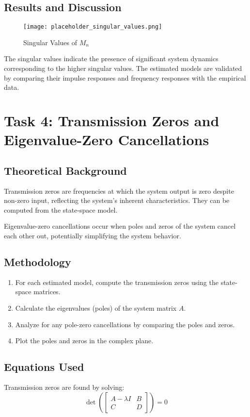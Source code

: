 \documentclass[12pt]{article}
\begin{document}
\subsection{Results and Discussion}
\begin{figure}[H]
    \centering
    \texttt{[image: placeholder\_singular\_values.png]}
    \caption{Singular Values of $M_n$}
    \label{fig:singular_values}
\end{figure}

The singular values indicate the presence of significant system dynamics corresponding to the higher singular values. The estimated models are validated by comparing their impulse responses and frequency responses with the empirical data.

\section{Task 4: Transmission Zeros and Eigenvalue-Zero Cancellations}
\subsection{Theoretical Background}
Transmission zeros are frequencies at which the system output is zero despite non-zero input, reflecting the system's inherent characteristics. They can be computed from the state-space model.

Eigenvalue-zero cancellations occur when poles and zeros of the system cancel each other out, potentially simplifying the system behavior.

\subsection{Methodology}
\begin{enumerate}
    \item For each estimated model, compute the transmission zeros using the state-space matrices.
    \item Calculate the eigenvalues (poles) of the system matrix $A$.
    \item Analyze for any pole-zero cancellations by comparing the poles and zeros.
    \item Plot the poles and zeros in the complex plane.
\end{enumerate}

\subsection{Equations Used}
Transmission zeros are found by solving:
\begin{equation}
    \det\left( \begin{bmatrix}
    A - \lambda I & B \\
    C & D
    \end{bmatrix} \right) = 0
\end{equation}
\end{document}
